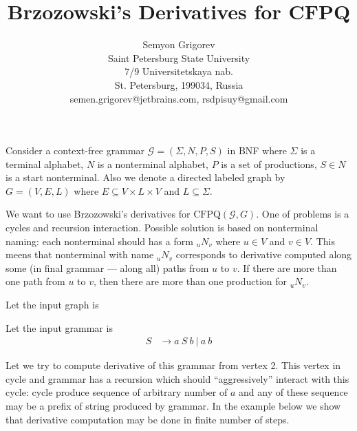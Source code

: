 \documentclass[12pt]{article}  %
\title{Brzozowski’s Derivatives for CFPQ}
\author{Semyon Grigorev
\\
       {Saint Petersburg State University}\\
       {7/9 Universitetskaya nab.}\\
       {St. Petersburg, 199034, Russia}\\
       semen.grigorev@jetbrains.com, rsdpisuy@gmail.com
       }
\date{}
\theoremstyle{definition}
\theoremstyle{remark}
\begin{document}
\maketitle



Consider a context-free grammar $\mathcal{G}=(\Sigma, N, P, S)$ in BNF where $\Sigma$ is a terminal alphabet, $N$ is 
a nonterminal alphabet, $P$ is a set of productions, $S \in N$ is a start nonterminal.
Also we denote a directed labeled graph by $G=(V,E,L)$ where $E \subseteq V \times L \times V$ and $L \subseteq \Sigma$. 

We want to use Brzozowski’s derivatives for $\text{CFPQ}(\mathcal{G},G)$.
One of problems is a cycles and recursion interaction.
Possible solution is based on nonterminal naming: each nonterminal should has a form $_{u}N_{v}$ where $u\in V$ and $v \in V$. 
This meens that nonterminal with name $_{u}N_{v}$ corresponds to derivative computed along some (in final grammar --- along all) paths from $u$ to $v$.
If there are more than one path from $u$ to $v$, then there are more than one production for $_{u}N_{v}$.

Let the input graph is
\\

 
Let the input grammar is 
\begin{align*}
S & \rightarrow a \ S \ b \ | \ a \ b 
\end{align*}

Let we try to compute derivative of this grammar from vertex 2.
This vertex in cycle and grammar has a recursion which should ``aggressively'' interact with this cycle: cycle produce sequence of arbitrary number of $a$ and any of these sequence may be a prefix of string produced by grammar.
In the example below we show that derivative computation may be done in finite number of steps.
\end{document}
